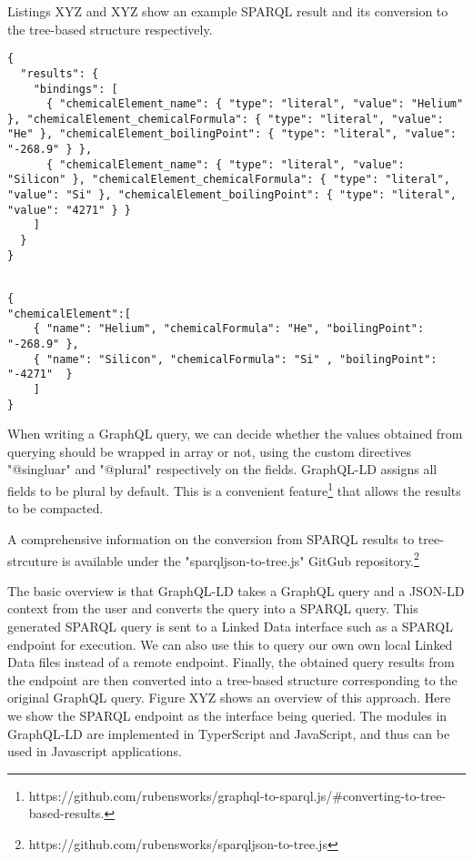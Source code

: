 Listings XYZ and XYZ show an example SPARQL result and its conversion to the tree-based structure respectively.

\begin{minipage}{\linewidth}
\begin{lstlisting}[label=listing:listing11, caption={SPARQL Algebra result}]
{
  "results": {
    "bindings": [
      { "chemicalElement_name": { "type": "literal", "value": "Helium" }, "chemicalElement_chemicalFormula": { "type": "literal", "value": "He" }, "chemicalElement_boilingPoint": { "type": "literal", "value": "-268.9" } },
      { "chemicalElement_name": { "type": "literal", "value": "Silicon" }, "chemicalElement_chemicalFormula": { "type": "literal", "value": "Si" }, "chemicalElement_boilingPoint": { "type": "literal", "value": "4271" } }
    ]
  }
}
\end{lstlisting}
\end{minipage}

\begin{minipage}{\linewidth}
\begin{lstlisting}[label=listing:listing12, caption={Tree-based JSON result}]

{
"chemicalElement":[
	{ "name": "Helium", "chemicalFormula": "He", "boilingPoint": "-268.9" },
	{ "name": "Silicon", "chemicalFormula": "Si" , "boilingPoint": "-4271"  }
	]
}

\end{lstlisting}
\end{minipage}

When writing a GraphQL query, we can decide whether the values obtained from querying should be wrapped in array or not, using the custom directives "@singluar" and "@plural" respectively on the fields. GraphQL-LD assigns all fields to be plural by default. This is a convenient feature\footnote{https://github.com/rubensworks/graphql-to-sparql.js/\#converting-to-tree-based-results.} that allows the results to be compacted.

A comprehensive information on the conversion from SPARQL results to tree-strcuture is available under the "sparqljson-to-tree.js" GitGub repository.\footnote{https://github.com/rubensworks/sparqljson-to-tree.js}

The basic overview is that GraphQL-LD takes a GraphQL query and a JSON-LD context from the user and converts the query into a SPARQL query. This generated SPARQL query is sent to a Linked Data interface such as a SPARQL endpoint for execution. We can also use this to query our own own local Linked Data files instead of a remote endpoint. Finally, the obtained query results from the endpoint are then converted into a tree-based structure corresponding to the original GraphQL query. Figure XYZ shows an overview of this approach. Here we show the SPARQL endpoint as the interface being queried. The modules in GraphQL-LD are implemented in TyperScript and JavaScript, and thus can be used in Javascript applications.

